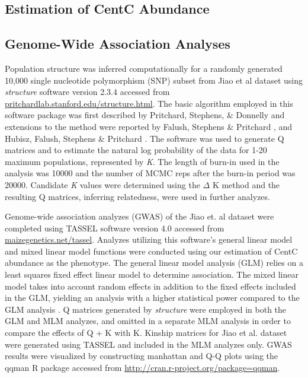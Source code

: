 \documentclass[12pt]{article}
\begin{document}
\subsection{Estimation of CentC Abundance} %

\subsection{Genome-Wide Association Analyses} %
Population structure was inferred computationally for a randomly generated 10,000 single nucleotide polymorphism (SNP) subset from Jiao et al dataset using \emph{structure} software version 2.3.4 accessed from \url{pritchardlab.stanford.edu/structure.html}.  The basic algorithm employed in this software package was first described by Pritchard, Stephens, \& Donnelly \cite{Pritchard2000} and extensions to the method were reported by Falush, Stephens \& Pritchard \cite{Falush2003}, \cite{Falush2007} and Hubisz, Falush, Stephens \& Pritchard \cite{Hubisz2009}.  The software was used to generate Q matrices and to estimate the natural log probability of the data for 1-20 maximum populations, represented by \emph{K}.  The length of burn-in used in the analysis was 10000 and the number of MCMC reps after the burn-in period was 20000.  Candidate \emph{K} values were determined using the $\Delta$ K method and the resulting Q matrices, inferring relatedness, were used in further analyzes.    

Genome-wide association analyzes (GWAS) of the Jiao et. al dataset were completed using TASSEL \cite{Bradbury2007} software version 4.0 accessed from \url{maizegenetics.net/tassel}.  Analyzes utilizing this software's general linear model and mixed linear model functions were conducted using our estimation of CentC abundance as the phenotype.  The general linear model analysis (GLM) relies on a least squares fixed effect linear model to determine association.  The mixed linear model takes into account random effects in addition to the fixed effects included in the GLM, yielding an analysis with a higher statistical power compared to the GLM analysis \cite{Yu2006}.  Q matrices generated by \emph{structure} were employed in both the GLM and MLM analyzes, and omitted in a separate MLM analysis in order to compare the effects of Q + K with K.  Kinship matrices for Jiao et al. dataset were generated using TASSEL and included in the MLM analyzes only.    
GWAS results were visualized by constructing manhattan and Q-Q plots using the qqman \cite{Turner2014} R package accessed from \url{http://cran.r-project.org/package=qqman}.   
\end{document}
